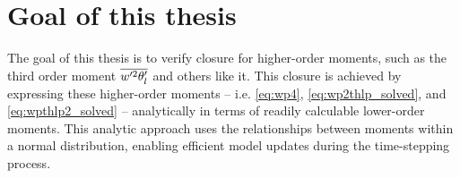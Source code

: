 \section{Goal of this thesis}\label{sec:goal-of-this-thesis}

The goal of this thesis is to verify closure for higher-order moments,
such as the third order moment $\overline{w'^2 \theta_l'}$ and others like it.
This closure is achieved by expressing these higher-order moments
-- i.e. \cref{eq:wp4}, \cref{eq:wp2thlp_solved}, and \cref{eq:wpthlp2_solved} --
analytically in terms of readily calculable lower-order moments.
This analytic approach uses the relationships between moments within a normal distribution,
enabling efficient model updates during the time-stepping process.